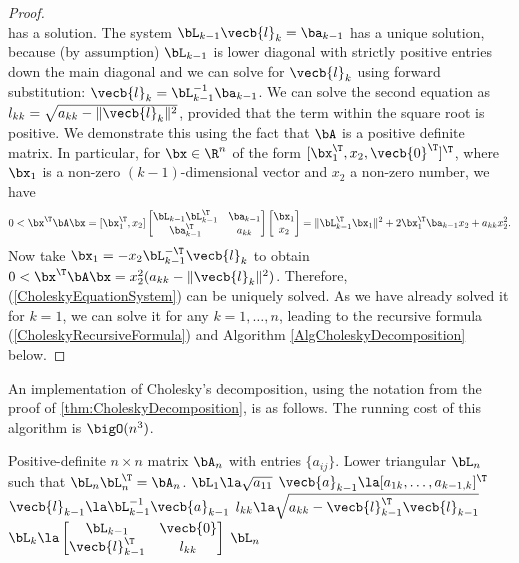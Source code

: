 \begin{proof}
\begin{equation}
	\end{equation}
	has a solution. The system $\bL_{k-1} \vecb{l}_k = \ba_{k-1}$ has a unique solution, because (by assumption) $\bL_{k-1}$ is lower diagonal with strictly positive entries down the main diagonal and we can solve for $\vecb{l}_k$ using forward substitution: $\vecb{l}_k = \bL_{k-1}^{-1} \ba_{k-1}$. We can solve the second equation as $l_{kk} = \sqrt{a_{kk} - \|\vecb{l}_k\|^2}$, provided that the term within the square root is positive. We demonstrate this using the fact that $\bA$ is a positive definite matrix. In particular, for $\bx \in \R^n$ of the form $[\bx_1^\T, x_2, \vecb{0}^\T]^\T$, where $\bx_1$ is a non-zero $(k-1)$-dimensional vector and $x_2$ a non-zero number, we have
	\begin{equation}
		\label{PositiveDefiniteCheck}
		0 < \bx^\T \bA \bx = [\bx_1^\T, x_2] \begin{bmatrix} \bL_{k-1}\bL_{k-1}^\T & \ba_{k-1} \\ \ba_{k-1}^\T & a_{kk} \end{bmatrix} \begin{bmatrix} \bx_1 \\ x_2 \end{bmatrix} = \|\bL_{k-1}^\T \bx_1\|^2 + 2\bx_1^\T \ba_{k-1} x_2 + a_{kk} x_2^2.
	\end{equation}
	Now take $\bx_1 = -x_2 \bL_{k-1}^{-\T} \vecb{l}_k$ to obtain $0 < \bx^\T \bA \bx = x_2^2 (a_{kk} - \|\vecb{l}_k\|^2)$. Therefore, (\ref{CholeskyEquationSystem}) can be uniquely solved. As we have already solved it for $k=1$, we can solve it for any $k=1, \dots, n$, leading to the recursive formula (\ref{CholeskyRecursiveFormula}) and Algorithm \ref{AlgCholeskyDecomposition} below.
\end{proof}

An implementation of Cholesky's decomposition, using the notation from the proof of \ref{thm:CholeskyDecomposition}, is as follows. The running cost of this algorithm is $\bigO(n^3)$.

\begin{algorithm}[H]
	\caption{Cholesky Decomposition}
	\label{AlgCholeskyDecomposition}
	\begin{algorithmic}[1]
		\Require Positive-definite $n \times n$ matrix $\bA_n$ with entries $\{a_{ij}\}$.
		\Ensure Lower triangular $\bL_n$ such that $\bL_n\bL_n^\T = \bA_n$.
		\State $\bL_1 \la \sqrt{a_{11}}$
		\State $\vecb{a}_{k-1} \la [a_{1k}, \dots, a_{k-1,k}]^\T$
		\State $\vecb{l}_{k-1} \la \bL_{k-1}^{-1} \vecb{a}_{k-1}$
		\State $l_{kk} \la \sqrt{a_{kk} - \vecb{l}_{k-1}^\T \vecb{l}_{k-1}}$
		\State $\bL_k \la \begin{bmatrix} \bL_{k-1} & \vecb{0} \\ \vecb{l}_{k-1}^\T & l_{kk} \end{bmatrix}$
		\EndFor
		\State \Return $\bL_n$
	\end{algorithmic}
\end{algorithm}

